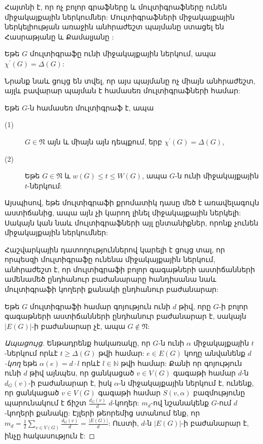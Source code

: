 Հայտնի է, որ ոչ բոլոր գրաֆները և մուլտիգրաֆները ունեն միջակայքային ներկումներ: Մուլտիգրաֆների միջակայքային ներկելիության առաջին անհրաժեշտ պայմանը ստացել են Հասրաթյանը և Քամալյանը \cite{AsratianKamalian1994,AsratianKamalian1987}: 
\begin{theorem}
\label{t1_class1} Եթե $G$ մուլտիգրաֆը ունի միջակայքային ներկում, ապա $\chi^{\prime}(G)=\Delta(G)$:
\end{theorem}

Նրանք նաև ցույց են տվել, որ այս պայմանը ոչ միայն անհրաժեշտ, այլև բավարար պայման է համասեռ մուլտիգրաֆների համար:

\begin{theorem}
\label{t1_regular} Եթե $G$-ն համասեռ մուլտիգրաֆ է, ապա
\begin{description}
\item[(1)] $G\in \mathfrak{N}$ այն և միայն այն դեպքում, երբ $\chi^{\prime}(G)=\Delta(G)$,
\item[(2)] Եթե $G\in \mathfrak{N}$ և $w(G)\leq t\leq W(G)$, ապա $G$-ն ունի միջակայքային $t$-ներկում:
\end{description}
\end{theorem}

Այսպիսով, եթե մուլտիգրաֆի քրոմատիկ դասը մեծ է առավելագույն աստիճանից, ապա այն չի կարող լինել միջակայքային ներկելի: Սակայն կան նաև մուլտիգրաֆների այլ ընտանիքներ, որոնք չունեն միջակայքային ներկումներ:

Հաշվարկային դատողություններով կարելի է ցույց տալ, որ որպեսզի մուլտիգրաֆը ունենա միջակայքային ներկում, անհրաժեշտ է, որ մուլտիգրաֆի բոլոր գագաթների աստիճանների ամենամեծ ընդհանուր բաժանարարը հանդիսանա նաև մուլտիգրաֆի կողերի քանակի ընդհանուր բաժանարար:

\begin{theorem}
\label{t1_divisor} Եթե $G$ մուլտիգրաֆի համար գոյություն ունի $d$ թիվ, որը $G$-ի բոլոր գագաթների աստիճանների ընդհանուր բաժանարար է, սակայն $\vert E(G)\vert$-ի բաժանարար չէ, ապա $G\notin \mathfrak{N}$:
\end{theorem}
\begin{proof}[Ապացույց]
Ենթադրենք հակառակը, որ $G$-ն ունի $\alpha$ միջակայքային $t$-ներկում
 որևէ $t\geq \Delta(G)$ թվի համար: $e\in E(G)$ կողը անվանենք
\emph{$d$-կող} եթե $\alpha(e)=d\cdot l$ որևէ $l\in \mathbb{N}$ թվի համար: Քանի որ գոյություն ունի $d$ թիվ այնպես, որ ցանկացած $v\in V(G)$ գագաթի համար $d$-ն $d_{G}(v)$-ի բաժանարար է, իսկ $\alpha$-ն միջակայքային ներկում է, ունենք, որ ցանկացած $v\in V(G)$ գագաթի համար $S\left(v,\alpha\right)$ բազմությունը պարունակում է ճիշտ $\frac{d_{G}(v)}{d}$ $d$-կողեր: $m_{d}$-ով նշանակենք $G$-ում $d$-կողերի քանակը: Էյլերի թեորեմից ստանում ենք, որ
$m_{d}=\frac{1}{2}\sum\limits_{v\in
V(G)}\frac{d_{G}(v)}{d}=\frac{\vert E(G)\vert}{d}$: Ուստի, $d$-ն $\vert E(G)\vert$-ի բաժանարար է, ինչը հակասություն է:
\end{proof}

